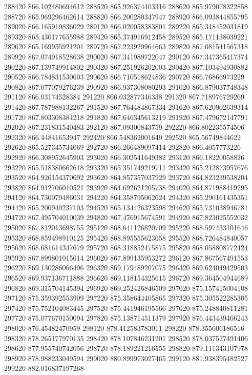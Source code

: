 {288420 866.102480694612
288520 865.926374403316
288620 865.979078322858
288720 865.969296462614
288820 866.200280347947
288920 866.093844855795
289020 866.165919836029
289120 866.020058383801
289220 865.318452031819
289320 865.430177655988
289420 865.374916912458
289520 865.171138039221
289620 865.169955921201
289720 867.223929964663
289820 867.081541567318
289920 867.074918528638
290020 867.341989722047
290120 867.347365417374
290220 867.139749914802
290320 867.251926202003
290420 867.103494930882
290520 866.784831530603
290620 866.710518624836
290720 866.76866973229
290820 867.077079276239
290920 866.937308080293
291020 866.879037748348
291120 866.03174528384
291220 866.032877346338
291320 867.718976729269
291420 867.787988132267
291520 867.764484867334
291620 867.620902639314
291720 867.803308384218
291820 867.646345613219
291920 867.479672147791
292020 867.231831540483
292120 867.09300843759
292220 866.802235574506
292320 866.44841653947
292420 866.548362001649
292520 865.56749844622
292620 865.527345734069
292720 866.266489097414
292820 866.4057773226
292920 866.308952645903
293020 866.302541649382
293120 866.18220058826
293220 865.518380662618
293320 865.351749219711
293420 865.212873957676
293520 864.926154370692
293620 864.857357037929
293720 864.823239538204
293820 864.912706010521
293920 864.692621205738
294020 864.871988419295
294120 864.730079486031
294220 864.358795062624
294320 865.290161435351
294420 865.200940237103
294520 865.134426323598
294620 865.731038946781
294720 867.495704010039
294820 867.476915674591
294920 867.823025552032
295020 867.812013698755
295120 868.641126820709
295220 868.597433101646
295320 868.859498910125
295420 868.895555623658
295520 868.726484840057
295620 868.681614347679
295720 868.318852475875
295820 868.058808772424
295920 867.899801015614
296020 867.899135953272
296120 867.867567491553
296220 869.130286066496
296320 869.179489207075
296420 869.624049429503
296520 869.937136711888
296620 869.118154325615
296720 869.364504944689
296820 869.315704145394
296920 869.252426846509
297020 875.157415004108
297120 875.359392553909
297220 875.358644405865
297320 875.305522285305
297420 875.752104083445
297520 875.441946195566
297620 875.248840811281
297720 875.077670150094
297820 875.138714511379
297920 876.443439466243
298020 876.45482470959
298120 878.412583783011
298220 878.355606186516
298320 878.265177970135
298420 878.107846231201
298520 878.037527491406
298620 877.955740742056
298720 878.189221216555
298820 879.111343107978
298920 878.988233049594
299020 880.899973027465
299120 881.938395482527
299220 882.016837197268
}
